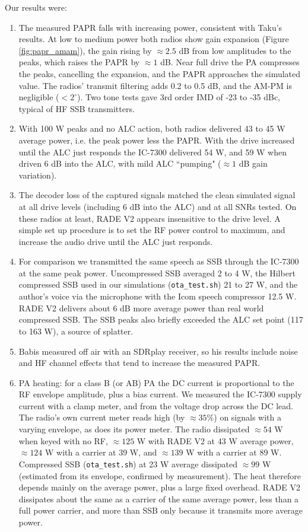 \documentclass{article}
\begin{document}
\noindent Our results were:
\begin{enumerate}
\item The measured PAPR falls with increasing power, consistent with Taku's results.  At low to medium power both radios show gain expansion (Figure \ref{fig:papr_amam}), the gain rising by $\approx 2.5$ \si{dB} from low amplitudes to the peaks, which raises the PAPR by $\approx 1$ \si{dB}.  Near full drive the PA compresses the peaks, cancelling the expansion, and the PAPR approaches the simulated value.  The radios' transmit filtering adds 0.2 to 0.5 \si{dB}, and the AM-PM is negligible ($< 2^{\circ}$).  Two tone tests gave 3rd order IMD of -23 to -35 \si{dBc}, typical of HF SSB transmitters.
\item With 100 \si{W} peaks and no ALC action, both radios delivered 43 to 45 \si{W} average power, i.e. the peak power less the PAPR.  With the drive increased until the ALC just responds the IC-7300 delivered 54 \si{W}, and 59 \si{W} when driven 6 \si{dB} into the ALC, with mild ALC ``pumping" ($\approx 1$ \si{dB} gain variation).
\item The decoder loss of the captured signals matched the clean simulated signal at all drive levels (including 6 \si{dB} into the ALC) and at all SNRs tested.  On these radios at least, RADE V2 appears insensitive to the drive level.  A simple set up procedure is to set the RF power control to maximum, and increase the audio drive until the ALC just responds.
\item For comparison we transmitted the same speech as SSB through the IC-7300 at the same peak power.  Uncompressed SSB averaged 2 to 4 \si{W}, the Hilbert compressed SSB used in our simulations (\texttt{ota\_test.sh}) 21 to 27 \si{W}, and the author's voice via the microphone with the Icom speech compressor 12.5 \si{W}.  RADE V2 delivers about 6 \si{dB} more average power than real world compressed SSB.  The SSB peaks also briefly exceeded the ALC set point (117 to 163 \si{W}), a source of splatter.
\item Babis measured off air with an SDRplay receiver, so his results include noise and HF channel effects that tend to increase the measured PAPR.
\item PA heating: for a class B (or AB) PA the DC current is proportional to the RF envelope amplitude, plus a bias current.  We measured the IC-7300 supply current with a clamp meter, and from the voltage drop across the DC lead.  The radio's own current meter reads high (by $\approx 35$\%) on signals with a varying envelope, as does its power meter.  The radio dissipated $\approx 54$ \si{W} when keyed with no RF, $\approx 125$ \si{W} with RADE V2 at 43 \si{W} average power, $\approx 124$ \si{W} with a carrier at 39 \si{W}, and $\approx 139$ \si{W} with a carrier at 89 \si{W}.  Compressed SSB (\texttt{ota\_test.sh}) at 23 \si{W} average dissipated $\approx 99$ \si{W} (estimated from its envelope, confirmed by measurement).  The heat therefore depends mainly on the average power, plus a large fixed overhead.  RADE V2 dissipates about the same as a carrier of the same average power, less than a full power carrier, and more than SSB only because it transmits more average power.
\end{enumerate}
\end{document}
